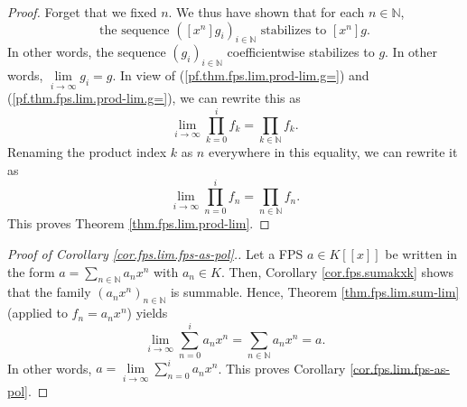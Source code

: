 \begin{fineprint}
\begin{proof}
Forget that we fixed $n$. We thus have shown that for each $n\in\mathbb{N}$,%
\[
\text{the sequence }\left(  \left[  x^{n}\right]  g_{i}\right)  _{i\in
\mathbb{N}}\text{ stabilizes to }\left[  x^{n}\right]  g.
\]
In other words, the sequence $\left(  g_{i}\right)  _{i\in\mathbb{N}}$
coefficientwise stabilizes to $g$. In other words, $\lim\limits_{i\rightarrow
\infty}g_{i}=g$. In view of (\ref{pf.thm.fps.lim.prod-lim.g=}) and
(\ref{pf.thm.fps.lim.prod-lim.g=}), we can rewrite this as%
\[
\lim\limits_{i\rightarrow\infty}\prod_{k=0}^{i}f_{k}=\prod_{k\in\mathbb{N}%
}f_{k}.
\]
Renaming the product index $k$ as $n$ everywhere in this equality, we can
rewrite it as%
\[
\lim\limits_{i\rightarrow\infty}\prod_{n=0}^{i}f_{n}=\prod_{n\in\mathbb{N}%
}f_{n}.
\]
This proves Theorem \ref{thm.fps.lim.prod-lim}.
\end{proof}

\begin{proof}
[Proof of Corollary \ref{cor.fps.lim.fps-as-pol}.]Let a FPS $a\in K\left[
\left[  x\right]  \right]  $ be written in the form $a=\sum_{n\in\mathbb{N}%
}a_{n}x^{n}$ with $a_{n}\in K$. Then, Corollary \ref{cor.fps.sumakxk} shows
that the family $\left(  a_{n}x^{n}\right)  _{n\in\mathbb{N}}$ is summable.
Hence, Theorem \ref{thm.fps.lim.sum-lim} (applied to $f_{n}=a_{n}x^{n}$)
yields
\[
\lim\limits_{i\rightarrow\infty}\sum_{n=0}^{i}a_{n}x^{n}=\sum_{n\in\mathbb{N}%
}a_{n}x^{n}=a.
\]
In other words, $a=\lim\limits_{i\rightarrow\infty}\sum_{n=0}^{i}a_{n}x^{n}$.
This proves Corollary \ref{cor.fps.lim.fps-as-pol}.
\end{proof}
\end{fineprint}

